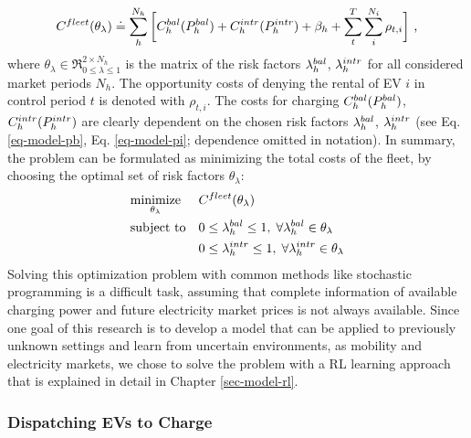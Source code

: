 \documentclass[a4paper, 12pt]{article}
\begin{document}
\begin{equation}
    C^{fleet}_{}(\theta_{\lambda}) \doteq \sum^{N_h}_h
    \bigg[ C^{bal}_{h}(P^{bal}_{h}) + C^{intr}_{h}(P^{intr}_{h}) + \beta_{h}
    + \sum_t^{T} \sum_i^{N_i} \rho_{t, i} \bigg] \text{ ,}
\end{equation}
where \(\theta_{\lambda}\!\in\!\Re_{0 \leq \lambda \leq 1}^{2 \times N_h}\) is the
matrix of the risk factors \(\lambda^{bal}_{h}\), \(\lambda^{intr}_{h}\) for all considered market periods
\(N_h\). The opportunity costs of denying the rental of EV \(i\) in control period
\(t\) is denoted with \(\rho_{t, i}\). The costs for charging \(C^{bal}_{h}(P^{bal}_{h})\),
\(C^{intr}_{h}(P^{intr}_{h})\) are clearly dependent on the chosen risk factors \(\lambda^{bal}_{h}\),
\(\lambda^{intr}_{h}\) (see Eq. \ref{eq-model-pb}, Eq. \ref{eq-model-pi}; dependence omitted in
notation). In summary, the problem can be formulated as minimizing the total
costs of the fleet, by choosing the optimal set of risk factors
\(\theta_{\lambda}\):
\begin{equation}
\begin{aligned}
    & \underset{\theta_{\lambda}}{\text{minimize}}
    && C^{fleet}_{}(\theta_{\lambda}) \\
    & \text{subject to}
    && 0 \leq \lambda^{bal}_{h} \leq 1, \; \forall \lambda^{bal}_{h} \in \theta_{\lambda}\\
    &&& 0 \leq \lambda^{intr}_{h} \leq 1, \; \forall \lambda^{intr}_{h} \in \theta_{\lambda}\\
\end{aligned}
\end{equation}
Solving this optimization problem with common methods like stochastic
programming is a difficult task, assuming that complete information of available
charging power and future electricity market prices is not always available.
Since one goal of this research is to develop a model that can be applied to
previously unknown settings and learn from uncertain environments, as mobility
and electricity markets, we chose to solve the problem with a RL learning
approach that is explained in detail in Chapter \ref{sec-model-rl}.

\subsubsection{Dispatching EVs to Charge}
\label{sec:orgdd69484}
\end{document}
